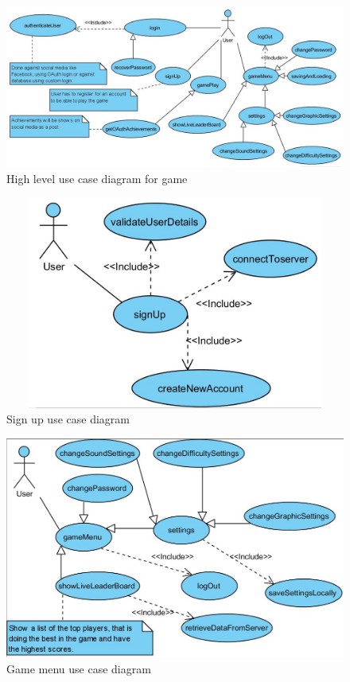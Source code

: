 \documentclass[letterpaper]{article}
\begin{document}
		\begin{figure}[ht!]
		\centering
		\includegraphics[width=180mm]{UML_Diagram/Use_Case/high_level_use_case_diagram}
		\caption{High level use case diagram for game}
		\label{overflow}
		\end{figure}
		
		\vspace{0.2in}
		
		\begin{figure}[ht!]
		\centering
		\includegraphics[width=180mm, height=70mm]{UML_Diagram/Use_Case/signup}
		\caption{Sign up use case diagram}
		\label{overflow}
		\end{figure}
		
		\vspace{0.2in}
		
		\begin{figure}[H]
		\centering
		\includegraphics[width=180mm]{UML_Diagram/Use_Case/game_menu}
		\caption{Game menu use case diagram}
		\label{overflow}
		\end{figure}
		
\end{document}
